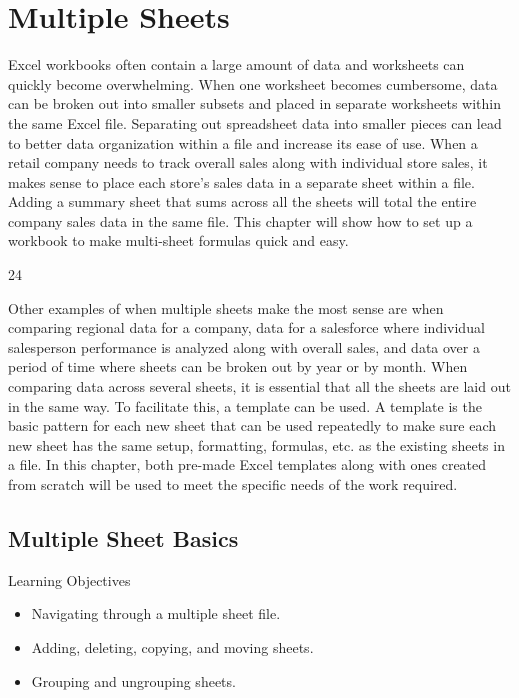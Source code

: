 \chapter{Multiple Sheets}\label{ch06:multiple_sheets}

Excel workbooks often contain a large amount of data and worksheets can quickly become overwhelming. When one worksheet becomes cumbersome, data can be broken out into smaller subsets and placed in separate worksheets within the same Excel file. Separating out spreadsheet data into smaller pieces can lead to better data organization within a file and increase its ease of use. When a retail company needs to track overall sales along with individual store sales, it makes sense to place each store's sales data in a separate sheet within a file. Adding a summary sheet that sums across all the sheets will total the entire company sales data in the same file. This chapter will show how to set up a workbook to make multi-sheet formulas quick and easy.

24

Other examples of when multiple sheets make the most sense are when comparing regional data for a company, data for a salesforce where individual salesperson performance is analyzed along with overall sales, and data over a period of time where sheets can be broken out by year or by month. When comparing data across several sheets, it is essential that all the sheets are laid out in the same way. To facilitate this, a template can be used. A template is the basic pattern for each new sheet that can be used repeatedly to make sure each new sheet has the same setup, formatting, formulas, etc. as the existing sheets in a file. In this chapter, both pre-made Excel templates along with ones created from scratch will be used to meet the specific needs of the work required.

\section{Multiple Sheet Basics}

\begin{center}
	\begin{objbox}{Learning Objectives}
		\begin{itemize}
			\setlength{\itemsep}{0pt}
			\setlength{\parskip}{0pt}
			\setlength{\parsep}{0pt}
			
			\item Navigating through a multiple sheet file.
			\item Adding, deleting, copying, and moving sheets.
			\item Grouping and ungrouping sheets.

		\end{itemize}
	\end{objbox}
\end{center}

